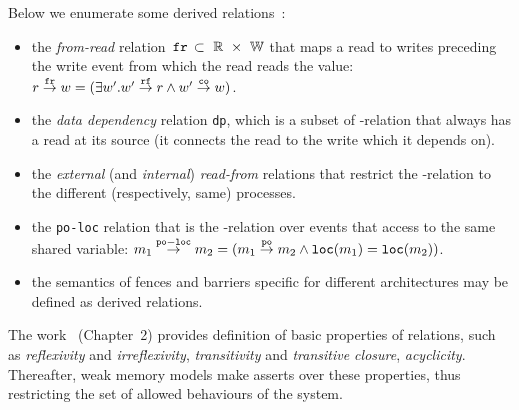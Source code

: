 Below we enumerate some derived relations~\cite{alglave2010shared}:

\begin{itemize}

    \item the \textit{from-read} relation $\,\mathtt{fr}\, \subset~\mathbb{R}~\times~\mathbb{W}$ that maps a read to writes preceding the write event from which the read reads the value: \\
    $r \overset{\mathtt{fr}}{\rightarrow} w = (\exists w' . w' \overset{\mathtt{rf}}{\rightarrow} r \land w' \overset{\mathtt{co}}{\rightarrow} w)$.

    \item the \textit{data dependency} relation \texttt{dp}, which is a subset of \po-relation that always has a read at its source (it connects the read to the write which it depends on).

    \item the \textit{external} (and \textit{internal}) \textit{read-from} relations that restrict the \rf-relation to the different (respectively, same) processes.

    \item the \texttt{po-loc} relation that is the \po-relation over events that access to the same shared variable:
    $m_1 \overset{\mathtt{po-loc}}{\rightarrow} m_2 = (m_1 \overset{\mathtt{po}}{\rightarrow} m_2 \land \mathtt{loc}(m_1) = \mathtt{loc}(m_2))$.

    \item the semantics of fences and barriers specific for different architectures may be defined as derived relations.


\end{itemize}

The work~\cite{alglave2010shared} (Chapter~2) provides definition of basic properties of relations, such as \textit{reflexivity} and \textit{irreflexivity}, \textit{transitivity} and \textit{transitive closure}, \textit{acyclicity}.
Thereafter, weak memory models make asserts over these properties, thus restricting the set of allowed behaviours of the system.




